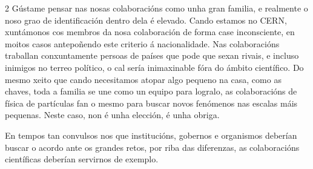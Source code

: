 \begin{multicols}{2}
Gústame pensar nas nosas colaboracións como unha gran familia, e realmente o
noso grao de identificación dentro dela é elevado. Cando estamos no CERN,
xuntámonos cos membros da nosa colaboración de forma case inconsciente, en
moitos casos antepoñendo este criterio á nacionalidade. Nas colaboracións
traballan conxuntamente persoas de países que pode que sexan rivais, e incluso
inimigos no terreo político, o cal sería inimaxinable fóra do ámbito
científico. Do mesmo xeito que cando necesitamos atopar algo pequeno na casa,
como as chaves, toda a familia se une como un equipo para logralo, as
colaboracións de física de partículas fan o mesmo para buscar novos fenómenos
nas escalas máis pequenas. Neste caso, non é unha elección, é unha obriga.

En tempos tan convulsos nos que institucións, gobernos e organismos deberían
buscar o acordo ante os grandes retos, por riba das diferenzas, as
colaboracións científicas deberían servirnos de exemplo.


\end{multicols}

